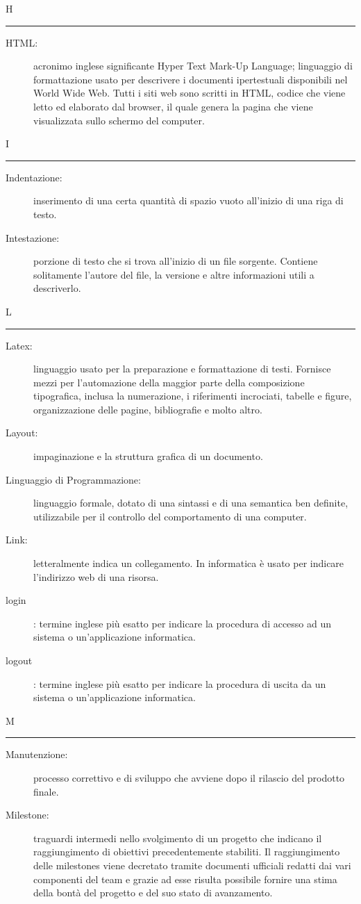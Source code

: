 \documentclass[11pt,a4paper]{article}
\begin{document}
\bigskip
\Huge H \bigskip
\hrule
\smallskip
\normalsize
\begin{description}
	\item[HTML:] acronimo inglese significante Hyper Text Mark-Up Language; linguaggio di formattazione usato per descrivere i documenti ipertestuali disponibili nel World Wide Web. Tutti i siti web sono scritti in HTML, codice che viene letto ed elaborato dal browser, il quale genera la pagina che viene visualizzata sullo schermo del computer.
\end{description}
\bigskip
\Huge I \bigskip
\hrule
\smallskip
\normalsize
\begin{description}
	\item[Indentazione:] inserimento di una certa quantità di spazio vuoto all'inizio di una riga di testo.
	\item[Intestazione:] porzione di testo che si trova all'inizio di un file sorgente. Contiene solitamente l'autore del file, la versione e altre informazioni utili a descriverlo.
\end{description}
\bigskip
\Huge L \bigskip
\hrule
\smallskip
\normalsize
\begin{description}
	\item[Latex:] linguaggio usato per la preparazione e formattazione di testi. Fornisce mezzi per l'automazione della maggior parte della composizione tipografica, inclusa la numerazione, i riferimenti incrociati, tabelle e figure, organizzazione delle pagine, bibliografie e molto altro.
	\item[Layout:] impaginazione e la struttura grafica di un documento.
	\item[Linguaggio di Programmazione:] linguaggio formale, dotato di una sintassi e di una semantica ben definite, utilizzabile per il controllo del comportamento di una computer.
	\item[Link:] letteralmente indica un collegamento. In informatica è usato per indicare l'indirizzo web di una risorsa.
	\item[login]: termine inglese più esatto per indicare la procedura di accesso ad un sistema o un'applicazione informatica.
	\item[logout]: termine inglese più esatto per indicare la procedura di uscita da un sistema o un'applicazione informatica.
\end{description}
\bigskip
\Huge M \bigskip
\hrule
\smallskip
\normalsize
\begin{description}
	\item[Manutenzione:] processo correttivo e di sviluppo che avviene dopo il rilascio del prodotto finale.
	\item[Milestone:] traguardi intermedi nello svolgimento di un progetto che indicano il raggiungimento di obiettivi precedentemente stabiliti. Il raggiungimento delle milestones viene decretato tramite documenti ufficiali redatti dai vari componenti del team e grazie ad esse risulta possibile fornire una stima della bontà del progetto e del suo stato di avanzamento.
\end{description}
\end{document}
